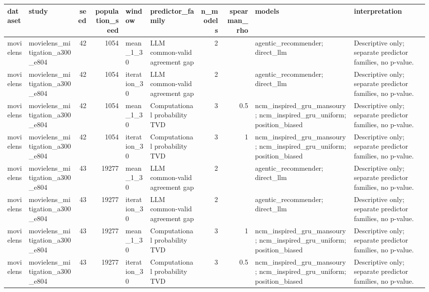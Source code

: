\begin{table}[htbp!]
\centering
\small
\setlength{\tabcolsep}{3pt}
\renewcommand{\arraystretch}{1.1}
\begin{tabular}{llrrllrrll}
\hline
dataset & study & seed & population\_seed & window & predictor\_family & n\_models & spearman\_rho & models & interpretation \\
\hline
movielens & movielens\_mitigation\_a300\_e804 & 42 & 1054 & mean\_1\_30 & LLM common-valid agreement gap & 2 & \textemdash{} & agentic\_recommender; direct\_llm & Descriptive only; separate predictor families, no p-value. \\
movielens & movielens\_mitigation\_a300\_e804 & 42 & 1054 & iteration\_30 & LLM common-valid agreement gap & 2 & \textemdash{} & agentic\_recommender; direct\_llm & Descriptive only; separate predictor families, no p-value. \\
movielens & movielens\_mitigation\_a300\_e804 & 42 & 1054 & mean\_1\_30 & Computational probability TVD & 3 & 0.5 & ncm\_inspired\_gru\_mansoury; ncm\_inspired\_gru\_uniform; position\_biased & Descriptive only; separate predictor families, no p-value. \\
movielens & movielens\_mitigation\_a300\_e804 & 42 & 1054 & iteration\_30 & Computational probability TVD & 3 & 1 & ncm\_inspired\_gru\_mansoury; ncm\_inspired\_gru\_uniform; position\_biased & Descriptive only; separate predictor families, no p-value. \\
movielens & movielens\_mitigation\_a300\_e804 & 43 & 19277 & mean\_1\_30 & LLM common-valid agreement gap & 2 & \textemdash{} & agentic\_recommender; direct\_llm & Descriptive only; separate predictor families, no p-value. \\
movielens & movielens\_mitigation\_a300\_e804 & 43 & 19277 & iteration\_30 & LLM common-valid agreement gap & 2 & \textemdash{} & agentic\_recommender; direct\_llm & Descriptive only; separate predictor families, no p-value. \\
movielens & movielens\_mitigation\_a300\_e804 & 43 & 19277 & mean\_1\_30 & Computational probability TVD & 3 & 1 & ncm\_inspired\_gru\_mansoury; ncm\_inspired\_gru\_uniform; position\_biased & Descriptive only; separate predictor families, no p-value. \\
movielens & movielens\_mitigation\_a300\_e804 & 43 & 19277 & iteration\_30 & Computational probability TVD & 3 & 0.5 & ncm\_inspired\_gru\_mansoury; ncm\_inspired\_gru\_uniform; position\_biased & Descriptive only; separate predictor families, no p-value. \\

\end{tabular}
\end{table}
